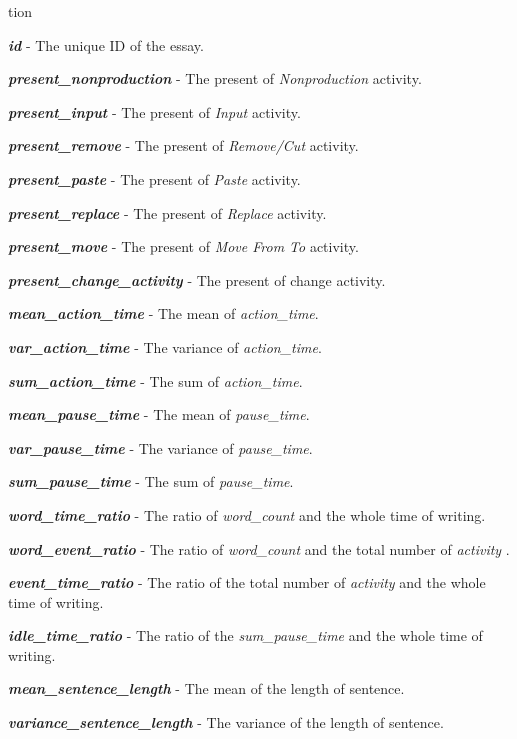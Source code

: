 tion\documentclass[8pt]{article}
\def\activity{\textit{activity} }
\begin{document}
{
\small
\begin{compactitem}
    \item \textbf{\textit{id}} - The unique ID of the essay.
    \item \textbf{\textit{present\_nonproduction}} - The present of \textit{Nonproduction} activity.
    \item \textbf{\textit{present\_input}} - The present of \textit{Input} activity.
    \item \textbf{\textit{present\_remove}} - The present of \textit{Remove/Cut} activity.
    \item \textbf{\textit{present\_paste}} - The present of \textit{Paste} activity.
    \item \textbf{\textit{present\_replace}} - The present of \textit{Replace} activity.
    \item \textbf{\textit{present\_move}} - The present of \textit{Move From To} activity.
    \item \textbf{\textit{present\_change\_activity}} - The present of change activity.
    \item \textbf{\textit{mean\_action\_time}} - The mean of \textit{action\_time}.
    \item \textbf{\textit{var\_action\_time}} - The variance of \textit{action\_time}.
    \item \textbf{\textit{sum\_action\_time}} - The sum of \textit{action\_time}.
    \item \textbf{\textit{mean\_pause\_time}} - The mean of \textit{pause\_time}.
    \item \textbf{\textit{var\_pause\_time}} - The variance of \textit{pause\_time}.
    \item \textbf{\textit{sum\_pause\_time}} - The sum of \textit{pause\_time}.
    \item \textbf{\textit{word\_time\_ratio}} - The ratio of \textit{word\_count} and the whole time of writing.
    \item \textbf{\textit{word\_event\_ratio}} - The ratio of \textit{word\_count} and the total number of \activity.
    \item \textbf{\textit{event\_time\_ratio}} - The ratio of the total number of \activity and the whole time of writing.
    \item \textbf{\textit{idle\_time\_ratio}} - The ratio of the \textit{sum\_pause\_time} and the whole time of writing.
    \item \textbf{\textit{mean\_sentence\_length}} - The mean of the length of sentence.
    \item \textbf{\textit{variance\_sentence\_length}} - The variance of the length of sentence.

\end{compactitem}}
\end{document}

